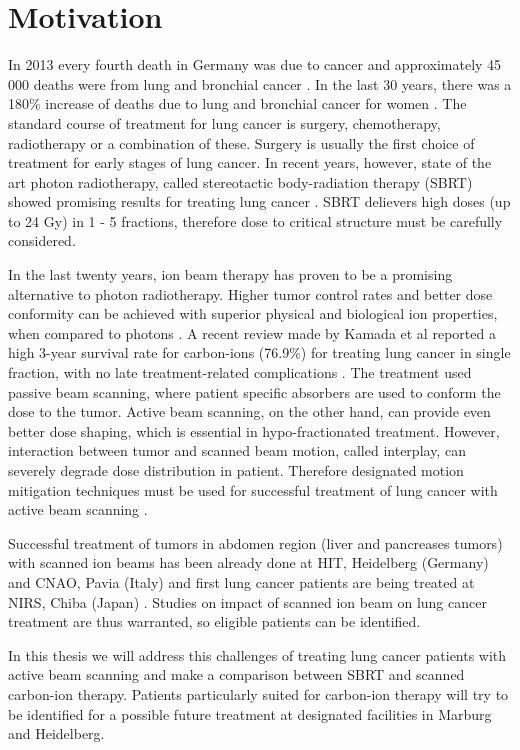 \documentclass[type=dr, dr=rernat, accentcolor=tud7b,colorbacktitle, bigchapter, openright, twoside, 12pt ]{tudthesis}
\begin{document}
\section*{Motivation}
In 2013 every fourth death in Germany was due to cancer and approximately 45 000 deaths were from lung and bronchial cancer \cite{Destatis2015}. In the last 30 years, there was a 180\% increase of deaths due to lung and bronchial cancer for women \cite{Destatis2015}.
The standard course of treatment for lung cancer is surgery, chemotherapy, radiotherapy or a combination of these. Surgery is usually the first choice of treatment for early stages of lung cancer. 
In recent years, however, state of the art photon radiotherapy, called stereotactic body-radiation therapy (SBRT) showed
promising results for treating lung cancer \cite{Baumann2009, Greco2011}. SBRT delievers high doses (up to 24 Gy) in 1 - 5 fractions, therefore dose to critical structure must be carefully considered.

In the last twenty years, ion beam therapy has proven to be a promising alternative to photon radiotherapy. Higher tumor control rates and better dose conformity can be achieved with superior physical and biological ion properties, when compared to photons \cite{Tsujii2008,Durante2010}.
A recent review made by Kamada et al reported a high 3-year survival rate for carbon-ions (76.9\%) for treating lung cancer in single fraction, with no late treatment-related complications \cite{Kamada2016}. 
The treatment used passive beam scanning, where patient specific absorbers are used to conform the dose to the tumor. Active beam scanning, on the other hand, can provide even better dose shaping, which is essential in hypo-fractionated treatment. 
However, interaction between tumor and scanned beam motion, called interplay, can severely degrade dose distribution in patient. Therefore designated motion mitigation techniques must be used for successful treatment of lung cancer with active beam scanning \cite{Bert2008}.

Successful treatment of tumors in abdomen region (liver and pancreases tumors) with scanned ion beams has been already done at HIT, Heidelberg (Germany) and CNAO, Pavia (Italy) \cite{Habermehl2013, Rossi2016} and first lung cancer patients are being treated at NIRS, Chiba (Japan) \cite{Mori2016}.
Studies on impact of scanned ion beam on lung cancer treatment are thus warranted, so eligible patients can be identified.

In this thesis we will address this challenges of treating lung cancer patients with active beam scanning and 
make a comparison between SBRT and scanned carbon-ion therapy. Patients particularly suited for carbon-ion therapy will try to be identified for a possible future treatment at designated facilities in Marburg and Heidelberg. 
\end{document}
